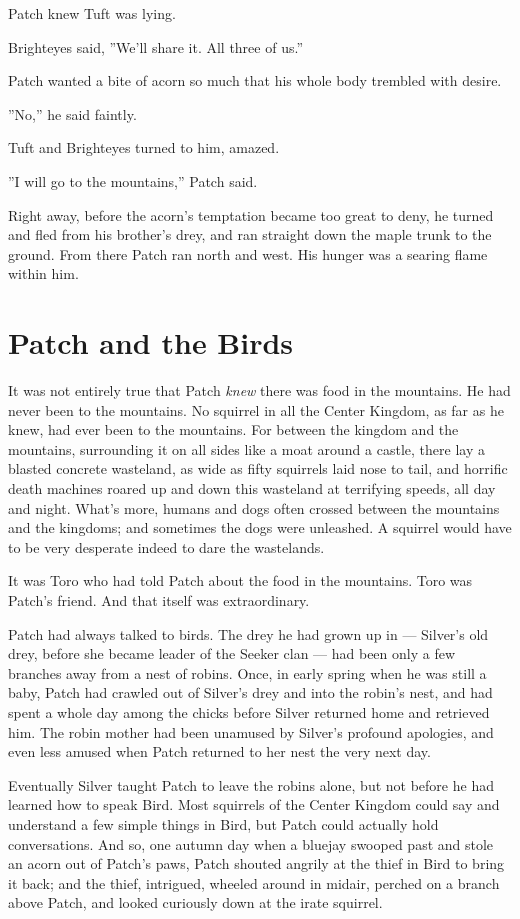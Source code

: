 \documentclass[12pt]{book}
\begin{document}
Patch knew Tuft was lying.

Brighteyes said, ''We'll share it. All three of us.''

Patch wanted a bite of acorn so much that his whole body trembled with desire.

''No,'' he said faintly.

Tuft and Brighteyes turned to him, amazed.

''I will go to the mountains,'' Patch said.

Right away, before the acorn's temptation became too great to deny, he turned and fled from his brother's drey, and ran straight down the maple trunk to the ground. From there Patch ran north and west. His hunger was a searing flame within him.


\section{Patch and the Birds}

It was not entirely true that Patch {\it knew} there was food in the mountains. He had never been to the mountains. No squirrel in all the Center Kingdom, as far as he knew, had ever been to the mountains. For between the kingdom and the mountains, surrounding it on all sides like a moat around a castle, there lay a blasted concrete wasteland, as wide as fifty squirrels laid nose to tail, and horrific death machines roared up and down this wasteland at terrifying speeds, all day and night. What's more, humans and dogs often crossed between the mountains and the kingdoms; and sometimes the dogs were unleashed. A squirrel would have to be very desperate indeed to dare the wastelands.

It was Toro who had told Patch about the food in the mountains. Toro was Patch's friend. And that itself was extraordinary.

Patch had always talked to birds. The drey he had grown up in ---
Silver's old drey, before she became leader of the Seeker clan ---
had been only a few branches away from a nest of robins. Once, in early spring when he was still a baby, Patch had crawled out of Silver's drey and into the robin's nest, and had spent a whole day among the chicks before Silver returned home and retrieved him. The robin mother had been unamused by Silver's profound apologies, and even less amused when Patch returned to her nest the very next day.

Eventually Silver taught Patch to leave the robins alone, but not before he had learned how to speak Bird. Most squirrels of the Center Kingdom could say and understand a few simple things in Bird, but Patch could actually hold conversations. And so, one autumn day when a bluejay swooped past and stole an acorn out of Patch's paws, Patch shouted angrily at the thief in Bird to bring it back; and the thief, intrigued, wheeled around in midair, perched on a branch above Patch, and looked curiously down at the irate squirrel.
\end{document}
